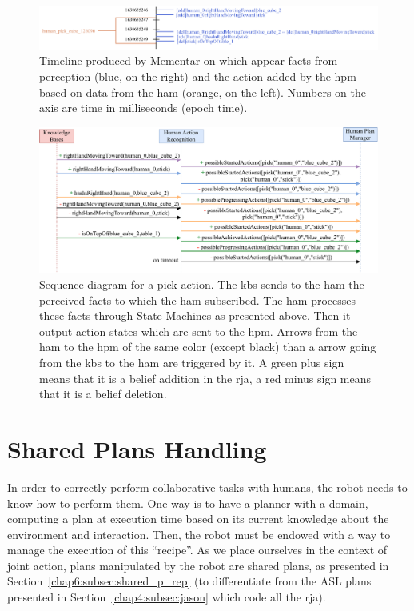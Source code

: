 \documentclass[a4paper,11pt,twoside]{StyleThese}
\begin{document}
\begin{landscape}
	\begin{figure}[!htb]
		\centering
		\includegraphics[width=0.9\linewidth]{figures/chapter2/action_reco_1.pdf}
		\caption{Timeline produced by Mementar on which appear facts from perception (blue, on the right) and the action added by the \acrlong{hpm} based on data from the \acrlong{ham} (orange, on the left). Numbers on the axis are time in milliseconds (epoch time).}
		\label{chap6:fig:action_reco_ex1_timeline}
	\end{figure}
	
	\begin{figure}[!htb]
		\centering
		\includegraphics[width=0.75\linewidth]{figures/chapter2/action_monitoring_ex1.pdf}
		\caption{Sequence diagram for a pick action. The \acrshort{kb}s sends to the \acrshort{ham} the perceived facts to which the \acrshort{ham} subscribed. The \acrshort{ham} processes these facts through State Machines as presented above. Then it output action states which are sent to the \acrfull{hpm}. Arrows from the \acrshort{ham} to the \acrshort{hpm} of the same color (except black) than a arrow going from the \acrshort{kb}s to the \acrshort{ham} are triggered by it. A green plus sign means that it is a belief addition in the \acrshort{rja}, a red minus sign means that it is a belief deletion.}
		\label{chap6:fig:action_reco_ex1}
	\end{figure}
\end{landscape}
\restoregeometry

\section{Shared Plans Handling}\label{chap6:sec:plan_handling}
In order to correctly perform collaborative tasks with humans, the robot needs to know how to perform them. One way is to have a planner with a domain, computing a plan at execution time based on its current knowledge about the environment and interaction. Then, the robot must be endowed with a way to manage the execution of this ``recipe''. As we place ourselves in the context of joint action, plans manipulated by the robot are shared plans, as presented in Section~\ref{chap6:subsec:shared_p_rep} (to differentiate from the ASL plans presented in Section~\ref{chap4:subsec:jason} which code all the \acrshort{rja}).
\end{document}
